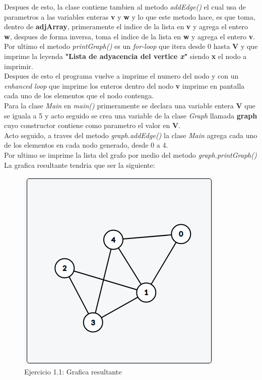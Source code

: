 \documentclass{article}
\begin{document}
				Despues de esto, la clase contiene tambien al metodo \emph{addEdge()} el cual usa de parametros a las variables enteras \textbf{v} y \textbf{w} y lo que este metodo hace, es que toma, dentro de \textbf{adjArray}, primeramente el indice de la lista en \textbf{v} y agrega el entero \textbf{w}, despues de forma inversa, toma el indice de la lista en \textbf{w} y agrega el entero \textbf{v}.\\
				
				Por ultimo el metodo \emph{printGraph()} es un \textit{for-loop} que itera desde 0 hasta \textbf{V} y que imprime la leyenda \textbf{"Lista de adyacencia del vertice \textit{x}"} siendo \textbf{x} el nodo a imprimir.\\
				
				Despues de esto el programa vuelve a imprime el numero del nodo y con un \textit{enhanced loop} que imprime los enteros dentro del nodo \textbf{v} imprime en pantalla cada uno de los elementos que el nodo contenga.\\
				
				Para la clase \emph{Main} en \emph{main()} primeramente se declara una variable entera \textbf{V} que se iguala a 5 y acto seguido se crea una variable de la clase \emph{Graph} llamada \textbf{graph} cuyo constructor contiene como parametro el valor en \textbf{V}.\\
				
				Acto seguido, a traves del metodo \emph{graph.addEdge()} la clase \emph{Main} agrega cada uno de los elementos en cada nodo generado, desde 0 a 4.\\
				
				Por ultimo se imprime la lista del grafo por medio del metodo \emph{graph.printGraph()}\\
				
				La grafica resultante tendria que ser la siguiente:
				
				\begin{figure}[H]
					\centering
					\includegraphics[scale=0.65]{images/graphMain.png}
					\caption*{Ejercicio 1.1: Grafica resultante}
				\end{figure}
							
\end{document}
